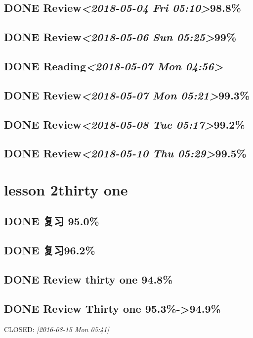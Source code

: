 \documentclass[11pt]{ctexart}
\begin{document}
\subsection{{\bfseries\sffamily DONE} Review\textit{<2018-05-04 Fri 05:10>}98.8\%}
\label{sec:org59d5be2}
\subsection{{\bfseries\sffamily DONE} Review\textit{<2018-05-06 Sun 05:25>}99\%}
\label{sec:org0870f50}
\subsection{{\bfseries\sffamily DONE} Reading\textit{<2018-05-07 Mon 04:56>}}
\label{sec:org4661a37}
\subsection{{\bfseries\sffamily DONE} Review\textit{<2018-05-07 Mon 05:21>}99.3\%}
\label{sec:org2590cc6}
\subsection{{\bfseries\sffamily DONE} Review\textit{<2018-05-08 Tue 05:17>}99.2\%}
\label{sec:orgc332a32}
\subsection{{\bfseries\sffamily DONE} Review\textit{<2018-05-10 Thu 05:29>}99.5\%}
\label{sec:orgaea8d7e}
\section{lesson 2thirty one}
\label{sec:org28ae6d7}
\subsection{{\bfseries\sffamily DONE} 复习 95.0\%}
\label{sec:orga285894}

\subsection{{\bfseries\sffamily DONE} 复习96.2\%}
\label{sec:org396ecdf}
\subsection{{\bfseries\sffamily DONE} Review thirty one 94.8\%}
\label{sec:org2022c9b}

\subsection{{\bfseries\sffamily DONE} Review Thirty one 95.3\%->94.9\%}
\label{sec:orgfdd980f}
CLOSED: \textit{[2016-08-15 Mon 05:41]}
\end{document}
